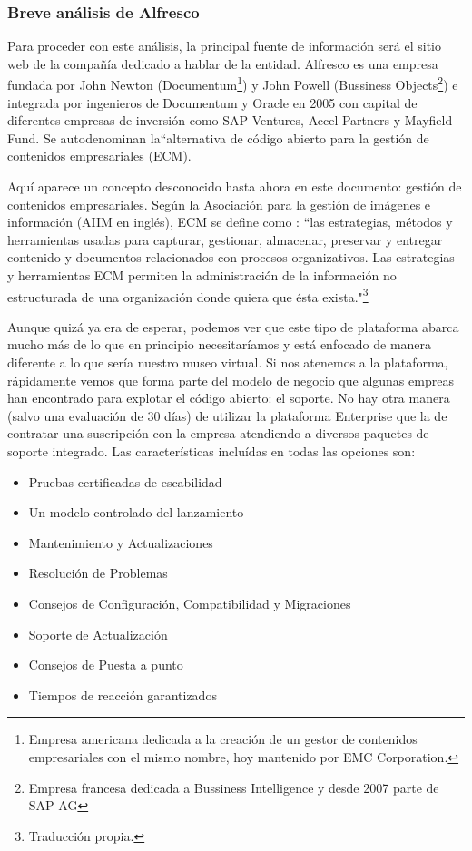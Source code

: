 \subsubsection{Breve análisis de Alfresco}
\par Para proceder con este análisis, la principal fuente de información será el sitio web de la compañía dedicado a hablar de la entidad. Alfresco es una empresa fundada por John Newton (Documentum\footnote{Empresa americana dedicada a la creación de un gestor de contenidos empresariales con el mismo nombre, hoy mantenido por EMC Corporation.\cite{references:documentum}}) y John Powell (Bussiness Objects\footnote{Empresa francesa dedicada a Bussiness Intelligence y desde 2007 parte de SAP AG\cite{references:bussinessobjects}}) e integrada por ingenieros de Documentum y Oracle en 2005 con capital de diferentes empresas de inversión como SAP Ventures, Accel Partners y Mayfield Fund. Se autodenominan la``alternativa de código abierto para la gestión de contenidos empresariales (ECM)\cite{references:alfrescoabout}.
\par Aquí aparece un concepto desconocido hasta ahora en este documento: gestión de contenidos empresariales. Según la Asociación para la gestión de imágenes e información (AIIM en inglés), ECM se define como \cite{references:ecmaiim}: ``las estrategias, métodos y herramientas usadas para capturar, gestionar, almacenar, preservar y entregar contenido y documentos relacionados con procesos organizativos. Las estrategias y herramientas ECM permiten la administración de la información no estructurada de una organización donde quiera que ésta exista."\renewcommand{\thefootnote}{\fnsymbol{footnote}}\footnote[1]{Traducción propia.}\renewcommand{\thefootnote}{\arabic{footnote}}	

\par Aunque quizá ya era de esperar, podemos ver que este tipo de plataforma abarca mucho más de lo que en principio necesitaríamos y está enfocado de manera diferente a lo que sería nuestro museo virtual. Si nos atenemos a la plataforma, rápidamente vemos que forma parte del modelo de negocio que algunas empreas han encontrado para explotar el código abierto: el soporte. No hay otra manera (salvo una evaluación de 30 días) de utilizar la plataforma Enterprise que la de contratar una suscripción con la empresa atendiendo a diversos paquetes de soporte integrado. Las características incluídas en todas las opciones son:

\begin{itemize}
\item Pruebas certificadas de escabilidad
\item Un modelo controlado del lanzamiento
\item Mantenimiento y Actualizaciones
\item Resolución de Problemas
\item Consejos de Configuración, Compatibilidad y Migraciones
\item Soporte de Actualización
\item Consejos de Puesta a punto
\item Tiempos de reacción garantizados
\end{itemize}

